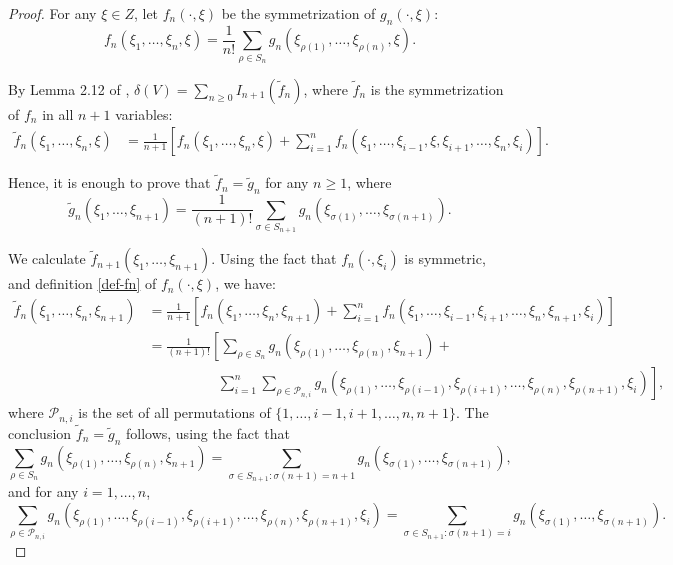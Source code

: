 \documentclass[12pt]{article}
\def\cP{\mathcal{P}}
\begin{document}
\begin{proof}
For any $\xi \in Z$, let $f_n(\cdot,\xi)$ be the symmetrization of $g_n(\cdot,\xi)$:
\begin{equation}
\label{def-fn}
f_n(\xi_1,\ldots,\xi_n,\xi)=\frac{1}{n!}\sum_{\rho \in S_n} g_n(\xi_{\rho(1)},\ldots,\xi_{\rho(n)},\xi).
\end{equation}


By Lemma 2.12 of \cite{BZ25}, 
$\delta(V)=\sum_{n\geq 0}I_{n+1}(\widetilde{f}_n)$,
where $\widetilde{f}_n$ is the symmetrization of $f_n$ in all $n+1$ variables:
\begin{align*}
\widetilde{f}_{n}(\xi_1,\ldots,\xi_n,\xi)&=\frac{1}{n+1}
\left[f_{n}(\xi_1,\ldots,\xi_n,\xi)+\sum_{i=1}^{n}
f_n(\xi_1,\ldots,\xi_{i-1},\xi,\xi_{i+1},\ldots,\xi_n,\xi_i) \right].
\end{align*}

Hence, it is enough to prove that $\widetilde{f}_n=\widetilde{g}_n$ for any $n\geq 1$, where 
\[
\widetilde{g}_n(\xi_1,\ldots,\xi_{n+1}) =\frac{1}{(n+1)!}\sum_{\sigma \in S_{n+1}} g_n(\xi_{\sigma(1)},\ldots,\xi_{\sigma(n+1)}).
\]

We calculate $\widetilde{f}_{n+1}(\xi_1,\ldots,\xi_{n+1})$. 
Using the fact that $f_n(\cdot,\xi_i)$ is symmetric, and definition \eqref{def-fn} of $f_n(\cdot,\xi)$, we have:
\begin{align*}
\widetilde{f}_{n}(\xi_1,\ldots,\xi_n,\xi_{n+1})
& =\frac{1}{n+1}\left[f_{n}(\xi_1,\ldots,\xi_n,\xi_{n+1})+\sum_{i=1}^{n}
f_n(\xi_1,\ldots,\xi_{i-1},\xi_{i+1},\ldots,\xi_n,\xi_{n+1},\xi_i) \right] \\
& =\frac{1}{(n+1)!}\left[\sum_{\rho \in S_n}g_{n}(\xi_{\rho(1)},\ldots,\xi_{\rho(n)},\xi_{n+1})+ \right.\\
& \qquad \qquad \quad \left. \sum_{i=1}^{n} \sum_{\rho \in \cP_{n,i}} g_n(\xi_{\rho(1)},\ldots,\xi_{\rho(i-1)},\xi_{\rho(i+1)}, \ldots, \xi_{\rho(n)},\xi_{\rho(n+1)},\xi_i)\right],
\end{align*}
where $\cP_{n,i}$ is the set of all permutations of $\{1,\ldots,i-1,i+1,\ldots,n,n+1\}$. The conclusion $\widetilde{f}_n=\widetilde{g}_n$ follows, using the fact that
\[
\sum_{\rho \in S_n}g_{n}(\xi_{\rho(1)},\ldots,\xi_{\rho(n)},\xi_{n+1})
=\sum_{\sigma \in S_{n+1}: \sigma(n+1)=n+1} g_n(\xi_{\sigma(1)},\ldots, \xi_{\sigma(n+1)}),
\]
and for any $i=1,\ldots,n$,
\[
\sum_{\rho \in \cP_{n,i}} g_n(\xi_{\rho(1)},\ldots,\xi_{\rho(i-1)},\xi_{\rho(i+1)}, \ldots, \xi_{\rho(n)},\xi_{\rho(n+1)},\xi_i)=\sum_{\sigma \in S_{n+1}: \sigma(n+1)=i} g_n(\xi_{\sigma(1)},\ldots, \xi_{\sigma(n+1)}).
\]
\end{proof}
\end{document}
